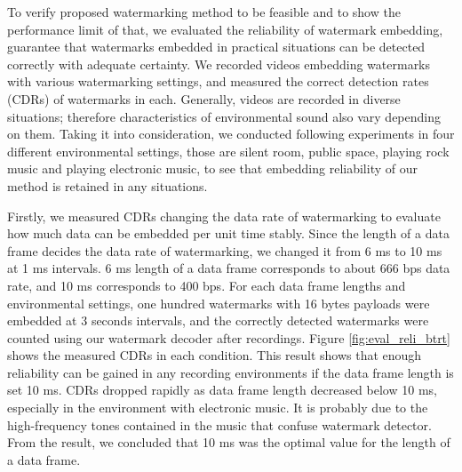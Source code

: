 To verify proposed watermarking method to be feasible and to show the performance limit of that, we evaluated the reliability of watermark embedding, guarantee that watermarks embedded in practical situations can be detected correctly with adequate certainty.
We recorded videos embedding watermarks with various watermarking settings, and measured the correct detection rates (CDRs) of watermarks in each.
Generally, videos are recorded in diverse situations; therefore characteristics of environmental sound also vary depending on them.
Taking it into consideration, we conducted following experiments in four different environmental settings, those are silent room, public space, playing rock music and playing electronic music, to see that embedding reliability of our method is retained in any situations.

Firstly, we measured CDRs changing the data rate of watermarking to evaluate how much data can be embedded per unit time stably.
Since the length of a data frame decides the data rate of watermarking, we changed it from 6 ms to 10 ms at 1 ms intervals.
6 ms length of a data frame corresponds to about 666 bps data rate, and 10 ms corresponds to 400 bps.
For each data frame lengths and environmental settings, one hundred watermarks with 16 bytes payloads were embedded at 3 seconds intervals, and the correctly detected watermarks were counted using our watermark decoder after recordings.
Figure \ref{fig:eval_reli_btrt} shows the measured CDRs in each condition.
This result shows that enough reliability can be gained in any recording environments if the data frame length is set 10 ms.
CDRs dropped rapidly as data frame length decreased below 10 ms, especially in the environment with electronic music.
It is probably due to the high-frequency tones contained in the music that confuse watermark detector.
From the result, we concluded that 10 ms was the optimal value for the length of a data frame.


